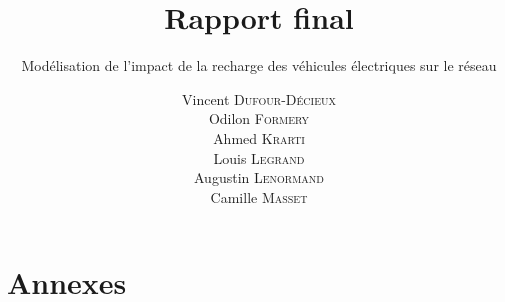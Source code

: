 \documentclass[12pt]{article}
\title{Rapport final}
\subtitle{Modélisation de l'impact de la recharge des véhicules électriques sur le réseau}
\author{ Vincent \textsc{Dufour-Décieux} \\ Odilon \textsc{Formery} \\ Ahmed \textsc{Krarti} \\ Louis \textsc{Legrand} \\ Augustin \textsc{Lenormand} \\ Camille \textsc{Masset} }
\begin{document}
\maketitle


\tableofcontents













\pagebreak



\clearpage
\appendix
\section{Annexes}


\end{document}
